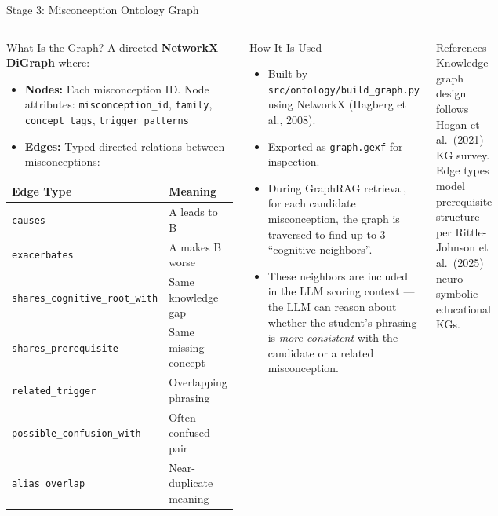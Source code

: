 \documentclass[aspectratio=169]{beamer}
\begin{document}
\begin{frame}{Stage 3: Misconception Ontology Graph}
\begin{columns}[T]
\begin{block}{What Is the Graph?}
A directed \textbf{NetworkX DiGraph} where:
\begin{itemize}
  \item \textbf{Nodes:} Each misconception ID. Node attributes: \texttt{misconception\_id}, \texttt{family}, \texttt{concept\_tags}, \texttt{trigger\_patterns}
  \item \textbf{Edges:} Typed directed relations between misconceptions:
\end{itemize}
\begin{center}
\scriptsize
\begin{tabular}{ll}
\toprule
Edge Type & Meaning\\
\midrule
\texttt{causes} & A leads to B\\
\texttt{exacerbates} & A makes B worse\\
\texttt{shares\_cognitive\_root\_with} & Same knowledge gap\\
\texttt{shares\_prerequisite} & Same missing concept\\
\texttt{related\_trigger} & Overlapping phrasing\\
\texttt{possible\_confusion\_with} & Often confused pair\\
\texttt{alias\_overlap} & Near-duplicate meaning\\
\bottomrule
\end{tabular}
\end{center}
\end{block}
\begin{block}{How It Is Used}
\begin{itemize}
  \item Built by \texttt{src/ontology/build\_graph.py} using NetworkX (Hagberg et al., 2008).
  \item Exported as \texttt{graph.gexf} for inspection.
  \item During GraphRAG retrieval, for each candidate misconception, the graph is traversed to find up to 3 ``cognitive neighbors''.
  \item These neighbors are included in the LLM scoring context --- the LLM can reason about whether the student's phrasing is \textit{more consistent} with the candidate or a related misconception.
\end{itemize}
\end{block}
\vspace{8pt}
\begin{block}{References}
Knowledge graph design follows Hogan et al.\ (2021) KG survey. Edge types model prerequisite structure per Rittle-Johnson et al.\ (2025) neuro-symbolic educational KGs.
\end{block}
\end{columns}
\end{frame}
\end{document}
